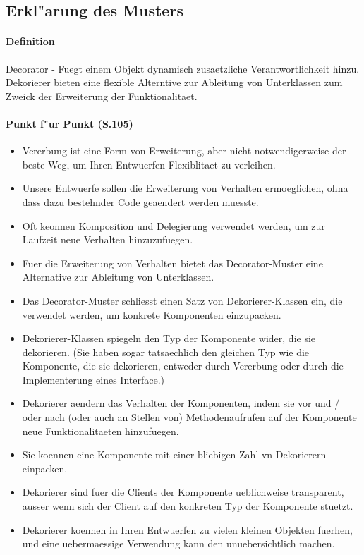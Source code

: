 \subsection{Erkl"arung des Musters}
\paragraph{Definition}
Decorator - Fuegt einem Objekt dynamisch zusaetzliche Verantwortlichkeit hinzu. Dekorierer bieten 
eine flexible Alterntive zur Ableitung von Unterklassen zum Zweick der Erweiterung der 
Funktionalitaet.

\paragraph{Punkt f"ur Punkt (S.105)}
\begin{itemize}
\item Vererbung ist eine Form von Erweiterung, aber nicht notwendigerweise der beste Weg, um Ihren 
  Entwuerfen Flexiblitaet zu verleihen. 
\item Unsere Entwuerfe sollen die Erweiterung von Verhalten ermoeglichen, ohna dass dazu bestehnder 
  Code geaendert werden muesste.
\item Oft keonnen Komposition und Delegierung verwendet werden, um zur Laufzeit neue Verhalten 
  hinzuzufuegen.
\item Fuer die Erweiterung von Verhalten bietet das Decorator-Muster eine Alternative zur Ableitung 
  von Unterklassen.
\item Das Decorator-Muster schliesst einen Satz von Dekorierer-Klassen ein, die verwendet werden, um 
  konkrete Komponenten einzupacken. 
\item Dekorierer-Klassen spiegeln den Typ der Komponente wider, die sie dekorieren. (Sie haben sogar 
  tatsaechlich den gleichen Typ wie die Komponente, die sie dekorieren, entweder durch Vererbung 
  oder durch die Implementerung eines Interface.)
\item Dekorierer aendern das Verhalten der Komponenten, indem sie vor und / oder nach (oder auch an 
  Stellen von) Methodenaufrufen auf der Komponente neue Funktionalitaeten hinzufuegen. 
\item Sie koennen eine Komponente mit einer bliebigen Zahl vn Dekorierern einpacken. 
\item Dekorierer sind fuer die Clients der Komponente ueblichweise transparent, ausser wenn sich der 
  Client auf den konkreten Typ der Komponente stuetzt.
\item Dekorierer koennen in Ihren Entwuerfen zu vielen kleinen Objekten fuerhen, und eine 
  uebermaessige Verwendung kann den unuebersichtlich machen.  
\end{itemize}
 
